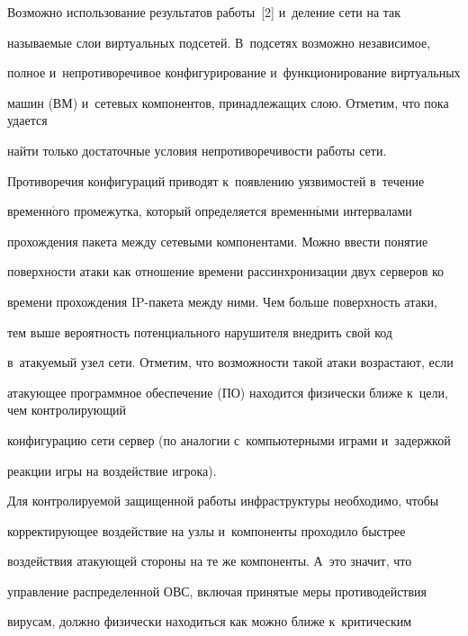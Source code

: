 Возможно использование результатов работы~[2] и~деление сети на так 


называемые слои виртуальных подсетей. В~подсетях возможно независимое, 


полное и~непротиворечивое конфигурирование и~функционирование виртуальных 


машин (ВМ) и~сетевых компонентов, принадлежащих слою. Отметим, что пока удается 


найти только достаточные условия непротиворечивости работы сети. 


{





}


  


  Противоречия конфигураций приводят к~появлению уязвимостей в~течение 


временн$\acute{\mbox{о}}$го промежутка, который определяется временн$\acute{\mbox{ы}}$ми интервалами 


прохождения пакета между сетевыми компонентами. Можно ввести понятие 


поверхности атаки как отношение времени рассинхронизации двух серверов ко 


времени прохождения IP-па\-ке\-та между ними. Чем больше поверхность атаки, 


тем выше вероятность потенциального нарушителя внедрить свой код 


в~атакуемый узел сети. Отметим, что возможности такой атаки возрастают, если 


атакующее программное обеспечение (ПО) находится физически ближе к~цели, чем контролирующий 


конфигурацию сети сервер (по аналогии с~компьютерными играми и~задержкой 


реакции игры на воздействие игрока). 


  


  Для контролируемой защищенной работы инфраструктуры необходимо, чтобы 


корректирующее воздействие на узлы и~компоненты проходило быстрее 


воздействия атакующей стороны на те же компоненты. А~это значит, что 


управление распределенной ОВС, включая принятые меры противодействия 


вирусам, должно физически находиться как можно ближе к~критическим 


